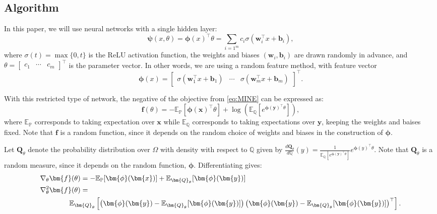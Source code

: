 \documentclass[twoside]{article}
\theoremstyle{definition}
\newcommand{\E}{\mathbb{E}}
\newcommand{\Prob}{\mathbb{P}}
\newcommand{\Q}{\mathbb{Q}}
\newcommand{\1}[1]{\scalebox{1.25}{$\mathds{1}$}\left[#1\right]}
\begin{document}
\subsection{Algorithm}
\label{ss:Algorithm}
In this paper, we will use neural networks with a single hidden layer:
\begin{equation}
\label{eq:randomFeature}
\bm{\psi}(x,\theta)=\bm{\phi}(x)^\top \theta=\sum_{i=1^m}c_i\sigma(\bm{w}_i^\top x+\bm{b}_i),
\end{equation}
where $\sigma(t)=\max\{0,t\}$ is the ReLU activation function, the weights and biases $(\bm{w}_i,\bm{b}_i)$ are drawn randomly in advance, and $\theta=\begin{bmatrix} c_1 & \cdots & c_m\end{bmatrix}^\top$ is the parameter vector. In other words, we are using a random feature method, with feature vector 
$$\bm{\phi}(x)=\begin{bmatrix} \sigma(\bm{w}_1^\top x+ \bm{b}_1) & \cdots & \sigma(\bm{w}_m^\top x+ \bm{b}_m)\end{bmatrix}^\top.
$$

With this restricted type of network, the negative of the objective from \eqref{eq:MINE} can be expressed as:
\begin{equation}
\label{eq:objective}
\bm{f}(\theta)=-\E_{\Prob}[\bm{\phi}(\bm{x})^\top\theta] +\log\left(\E_{\Q}[e^{\bm{\phi}(\bm{y})^\top \theta}] \right),
\end{equation}
where $\E_{\Prob}$ corresponds to taking expectation over  $\bm{x}$ while $\E_{\Q}$ corresponds to taking expectations over $\bm{y}$, keeping the weights and baises fixed.  
Note that $\bm{f}$ is a random function, since it depends on the random choice of weights and biases in the construction of $\bm{\phi}$. 

Let $\bm{Q}_{\theta}$ denote the probability distribution over $\Omega$ with density with respect to $\Q$ given by $\frac{d\bm{Q}_{\theta}}{d\Q}(y)=\frac{1}{\E_{\Q}[e^{\bm{\phi}(\bm{y})^\top \theta}]}e^{\bm{\phi}(y)^\top \theta}.$ Note that $\bm{Q}_{\theta}$ is a random measure, since it depends on the random function, $\bm{\phi}$. Differentiating gives:
\begin{subequations}
\begin{align}
\label{eq:exactGradient}
\nabla_{\theta}\bm{f}(\theta)&
= -\E_{\Prob}[\bm{\phi}(\bm{x})]+\E_{\bm{Q}_{\theta}}[\bm{\phi}(\bm{y})] \\
\label{eq:hessian}
\nabla^2_{\theta}\bm{f}(\theta)&=\\
\nonumber
&\hspace{-16pt}\E_{\bm{Q}_{\theta}}\left[\left(\bm{\phi}(\bm{y})-\E_{\bm{Q}_{\theta}}[\bm{\phi}(\bm{y})] \right) \left(\bm{\phi}(\bm{y})-\E_{\bm{Q}_{\theta}}[\bm{\phi}(\bm{y})] \right)^\top\right].
\end{align}
\end{subequations}
\end{document}
